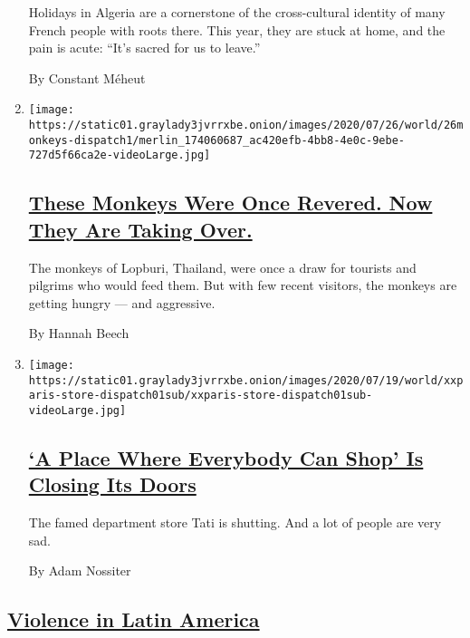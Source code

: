 \begin{enumerate}
  Holidays in Algeria are a cornerstone of the cross-cultural identity
  of many French people with roots there. This year, they are stuck at
  home, and the pain is acute: ``It's sacred for us to leave.''

  By Constant Méheut
\item
  \texttt{[image: https://static01.graylady3jvrrxbe.onion/images/2020/07/26/world/26monkeys-dispatch1/merlin\_174060687\_ac420efb-4bb8-4e0c-9ebe-727d5f66ca2e-videoLarge.jpg]}

  \hypertarget{these-monkeys-were-once-revered-now-they-are-taking-over}{%
  \subsection{\texorpdfstring{\href{/2020/07/25/world/asia/thailand-monkeys.html}{These
  Monkeys Were Once Revered. Now They Are Taking
  Over.}}{These Monkeys Were Once Revered. Now They Are Taking Over.}}\label{these-monkeys-were-once-revered-now-they-are-taking-over}}

  The monkeys of Lopburi, Thailand, were once a draw for tourists and
  pilgrims who would feed them. But with few recent visitors, the
  monkeys are getting hungry --- and aggressive.

  By Hannah Beech
\item
  \texttt{[image: https://static01.graylady3jvrrxbe.onion/images/2020/07/19/world/xxparis-store-dispatch01sub/xxparis-store-dispatch01sub-videoLarge.jpg]}

  \hypertarget{a-place-where-everybody-can-shop-is-closing-its-doors}{%
  \subsection{\texorpdfstring{\href{/2020/07/20/world/europe/france-paris-tati-coronavirus.html}{`A
  Place Where Everybody Can Shop' Is Closing Its
  Doors}}{`A Place Where Everybody Can Shop' Is Closing Its Doors}}\label{a-place-where-everybody-can-shop-is-closing-its-doors}}

  The famed department store Tati is shutting. And a lot of people are
  very sad.

  By Adam Nossiter
\end{enumerate}

\hypertarget{violence-in-latin-america}{%
\subsection{\texorpdfstring{\href{/spotlight/violence-in-latin-america}{Violence
in Latin
America}}{Violence in Latin America}}\label{violence-in-latin-america}}

